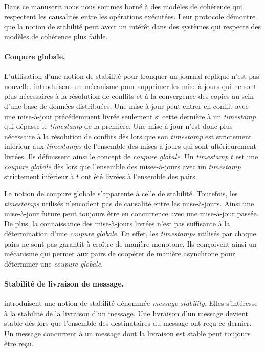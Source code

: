 Dans ce manuscrit nous nous sommes borné à des modèles de cohérence qui respectent les causalités entre les opérations exécutées.
Leur protocole démontre que la notion de stabilité peut avoir un intérêt dans des systèmes qui respecte des modèles de cohérence plus faible.

\paragraph{Coupure globale.} L'utilisation d'une notion de stabilité pour tronquer un journal répliqué n'est pas nouvelle.
\textcite{sarin_1987_discarding} introduisent un mécanisme pour supprimer les mise-à-jours qui ne sont plus nécessaires à la résolution de conflits et à la convergence des copies au sein d'une base de données distribuées.
Une mise-à-jour peut entrer en conflit avec une mise-à-jour précédemment livrée seulement si cette dernière à un \emph{timestamp} qui dépasse le \emph{timestamp} de la première.
Une mise-à-jour n'est donc plus nécessaire à la résolution de conflits dès lors que son \emph{timestamp} est strictement inférieur aux \emph{timestamps} de l'ensemble des mises-à-jours
qui sont ultérieurement livrées.
Ils définissent ainsi le concept de \emph{coupure globale}.
Un \emph{timestamp} $t$ est une \emph{coupure globale} dès lors que l'ensemble des mises-à-jours avec un \emph{timestamp} strictement inférieur à $t$ ont été livrées à l'ensemble des pairs.

La notion de coupure globale s'apparente à celle de stabilité.
Toutefois, les \emph{timestamps} utilisés n'encodent pas de causalité entre les mise-à-jours.
Ainsi une mise-à-jour future peut toujours être en concurrence avec une mise-à-jour passée.
De plus, la connaissance des mise-à-jours livrées n'est pas suffisante à la détermination d'une \emph{coupure globale}.
En effet, les \emph{timestamps} utilisés par chaque pairs ne sont pas garantit à croître de manière monotone.
Ils conçoivent ainsi un mécanisme qui permet aux pairs de coopérer de manière asynchrone pour déterminer une \emph{coupure globale}.

\paragraph{Stabilité de livraison de message.} \textcite{birman_1991_causalmulticast} introduisent une notion de stabilité dénommée \emph{message stability}.
Elles s'intéresse à la stabilité de  la livraison d'un message.
Une livraison d'un message devient stable dès lors que l'ensemble des destinataires du message ont reçu ce dernier.
Un message concurrent à un message dont la livraison est stable peut toujours être reçu.


